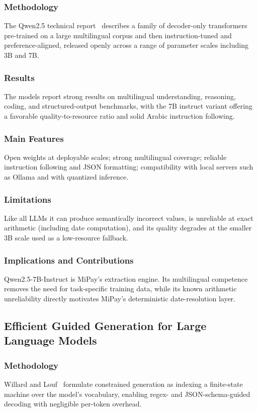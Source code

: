 \subsubsection{Methodology}
The Qwen2.5 technical report~\cite{qwen2024qwen25} describes a family of
decoder-only transformers pre-trained on a large multilingual corpus and then
instruction-tuned and preference-aligned, released openly across a range of
parameter scales including 3B and 7B.

\subsubsection{Results}
The models report strong results on multilingual understanding, reasoning, coding,
and structured-output benchmarks, with the 7B instruct variant offering a
favorable quality-to-resource ratio and solid Arabic instruction following.

\subsubsection{Main Features}
Open weights at deployable scales; strong multilingual coverage; reliable
instruction following and JSON formatting; compatibility with local servers such
as Ollama and with quantized inference.

\subsubsection{Limitations}
Like all LLMs it can produce semantically incorrect values, is unreliable at
exact arithmetic (including date computation), and its quality degrades at the
smaller 3B scale used as a low-resource fallback.

\subsubsection{Implications and Contributions}
Qwen2.5-7B-Instruct is MiPay's extraction engine. Its multilingual competence
removes the need for task-specific training data, while its known arithmetic
unreliability directly motivates MiPay's deterministic date-resolution layer.

\subsection{Efficient Guided Generation for Large Language Models}

\subsubsection{Methodology}
Willard and Louf~\cite{willard2023outlines} formulate constrained generation as
indexing a finite-state machine over the model's vocabulary, enabling
regex- and JSON-schema-guided decoding with negligible per-token overhead.

